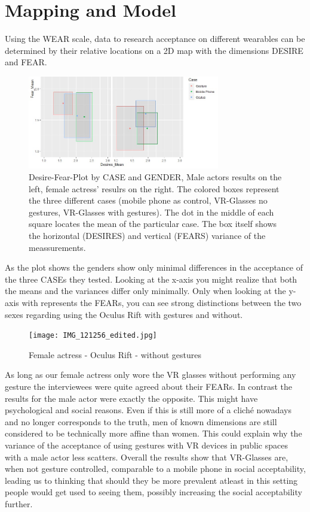 \documentclass[sigchi]{acmart}
\begin{document}
\section {Mapping and Model}
Using the WEAR scale, data to research acceptance on different wearables can be determined by their relative locations on a 2D map with the dimensions DESIRE and FEAR.

\begin{figure}[h]
\includegraphics[width=84mm]{scmplot_v4_cut.jpg} 
\caption{Desire-Fear-Plot by CASE and GENDER, Male actors results on the left, female actress' resulrs on the right. The colored boxes represent the three different cases  (mobile phone as control, VR-Glasses no gestures, VR-Glasses with gestures). The dot in the middle of each square locates the mean of the particular case. The box itself shows the horizontal (DESIRES) and vertical (FEARS) variance of the meassurements.}
\end{figure}

As the plot shows the genders show only minimal differences in the acceptance of the three CASEs they tested. Looking at the x-axis you might realize that both the means and the variances differ only minimally. Only when looking at the y-axis with represents the FEARs, you can see strong distinctions between the two sexes regarding using the Oculus Rift with gestures and without.

\begin{figure}[h]
\texttt{[image: IMG\_121256\_edited.jpg]} 
\caption{Female actress - Oculus Rift - without gestures}
\end{figure}

 As long as our female actress only wore the VR glasses without performing any gesture the interviewees were quite agreed about their FEARs. In contrast the results for the male actor were exactly the opposite. This might have psychological and social reasons. Even if this is still more of a cliché nowadays and no longer corresponds to the truth, men of known dimensions are still considered to be technically more affine than women. This could explain why the variance of the acceptance of using gestures with VR devices in public spaces with a male actor less scatters.  Overall the results show that VR-Glasses are, when not gesture controlled, comparable to a mobile phone in social acceptability, leading us to thinking that should they be more prevalent atleast in this setting people would get used to seeing them, possibly increasing the social acceptability further.
\end{document}
